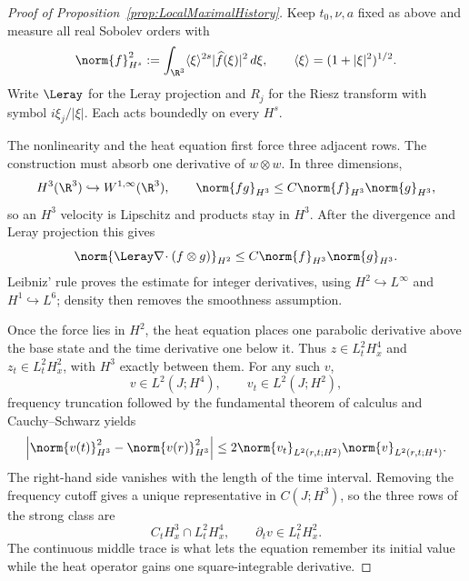 \begin{proof}[Proof of Proposition~\ref{prop:LocalMaximalHistory}]
Keep \(t_0,\nu,a\) fixed as above and measure all real Sobolev orders with
\[
  \norm{f}_{H^s}^2
  :=\int_{\R^3}\langle\xi\rangle^{2s}
       |\widehat f(\xi)|^2\,d\xi,
  \qquad
  \langle\xi\rangle=(1+|\xi|^2)^{1/2}.
\]
Write \(\Leray\) for the Leray projection and \(R_j\) for the Riesz transform
with symbol \(i\xi_j/|\xi|\).  Each acts boundedly on every \(H^s\).

The nonlinearity and the heat equation first force three adjacent rows.  The
construction must absorb one derivative of \(w\otimes w\).  In three
dimensions,
\[
  H^3(\R^3)\hookrightarrow W^{1,\infty}(\R^3),
  \qquad
  \norm{fg}_{H^3}\leq C\norm{f}_{H^3}\norm{g}_{H^3},
\]
so an \(H^3\) velocity is Lipschitz and products stay in \(H^3\).  After the
divergence and Leray projection this gives
\begin{equation}
  \norm{\Leray\nabla\!\cdot(f\otimes g)}_{H^2}
  \leq C\norm{f}_{H^3}\norm{g}_{H^3}.
  \label{eq:LocalProductEstimate}
\end{equation}
Leibniz’ rule proves the estimate for integer derivatives, using
\(H^2\hookrightarrow L^\infty\) and \(H^1\hookrightarrow L^6\); density then
removes the smoothness assumption.

Once the force lies in \(H^2\), the heat equation places one parabolic derivative
above the base state and the time derivative one below it.  Thus
\(z\in L^2_tH^4_x\) and \(z_t\in L^2_tH^2_x\), with \(H^3\) exactly between
them.  For any such \(v\),
\[
  v\in L^2(J;H^4),
  \qquad
  v_t\in L^2(J;H^2),
\]
frequency truncation followed by the fundamental theorem of calculus and
Cauchy--Schwarz yields
\begin{equation}
  \left|
    \norm{v(t)}_{H^3}^2-\norm{v(r)}_{H^3}^2
  \right|
  \leq
  2\norm{v_t}_{L^2(r,t;H^2)}
   \norm{v}_{L^2(r,t;H^4)}.
  \label{eq:LocalAdjacentTrace}
\end{equation}
The right-hand side vanishes with the length of the time interval.  Removing the
frequency cutoff gives a unique representative in \(C(J;H^3)\), so
the three rows of the strong class are
\[
  C_tH^3_x\cap L^2_tH^4_x,
  \qquad
  \partial_t v\in L^2_tH^2_x.
\]
The continuous middle trace is what lets the equation remember its initial
value while the heat operator gains one square-integrable derivative.


\end{proof}
